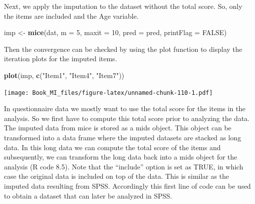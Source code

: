 \documentclass[]{book}
\newenvironment{Shaded}{\begin{snugshade}}{\end{snugshade}}
\newcommand{\KeywordTok}[1]{\textcolor[rgb]{0.13,0.29,0.53}{\textbf{#1}}}
\newcommand{\DataTypeTok}[1]{\textcolor[rgb]{0.13,0.29,0.53}{#1}}
\newcommand{\DecValTok}[1]{\textcolor[rgb]{0.00,0.00,0.81}{#1}}
\newcommand{\StringTok}[1]{\textcolor[rgb]{0.31,0.60,0.02}{#1}}
\newcommand{\OtherTok}[1]{\textcolor[rgb]{0.56,0.35,0.01}{#1}}
\newcommand{\OperatorTok}[1]{\textcolor[rgb]{0.81,0.36,0.00}{\textbf{#1}}}
\newcommand{\NormalTok}[1]{#1}
\begin{document}
Next, we apply the imputation to the dataset without the total score.
So, only the items are included and the Age variable.

\begin{Shaded}
\begin{Highlighting}[]
\NormalTok{imp <-}\StringTok{ }\KeywordTok{mice}\NormalTok{(dat, }\DataTypeTok{m =} \DecValTok{5}\NormalTok{, }\DataTypeTok{maxit =} \DecValTok{10}\NormalTok{, }\DataTypeTok{pred =}\NormalTok{ pred, }\DataTypeTok{printFlag =} \OtherTok{FALSE}\NormalTok{)}
\end{Highlighting}
\end{Shaded}

Then the convergence can be checked by using the plot function to
display the iteration plots for the imputed items.

\begin{Shaded}
\begin{Highlighting}[]
\KeywordTok{plot}\NormalTok{(imp, }\KeywordTok{c}\NormalTok{(}\StringTok{"Item1"}\NormalTok{, }\StringTok{"Item4"}\NormalTok{, }\StringTok{"Item7"}\NormalTok{))}
\end{Highlighting}
\end{Shaded}

\texttt{[image: Book\_MI\_files/figure-latex/unnamed-chunk-110-1.pdf]}

In questionnaire data we mostly want to use the total score for the
items in the analysis. So we first have to compute this total score
prior to analyzing the data. The imputed data from mice is stored as a
mids object. This object can be transformed into a data frame where the
imputed datasets are stacked as long data. In this long data we can
compute the total score of the items and subsequently, we can transform
the long data back into a mids object for the analysis (R code 8.5).
Note that the ``include'' option is set as TRUE, in which case the
original data is included on top of the data. This is similar as the
imputed data resulting from SPSS. Accordingly this first line of code
can be used to obtain a dataset that can later be analyzed in SPSS.

\begin{Shaded}
\end{Shaded}
\end{document}
